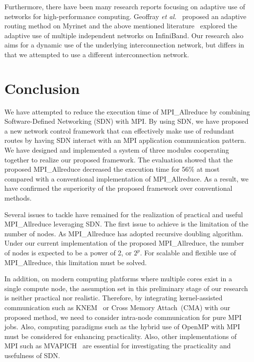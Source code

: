 Furthermore, there have been many research reports focusing on adaptive
use of networks for high-performance computing. Geoffray \emph{et
al.}~\autocite{Geoffray2008} proposed an adaptive routing method on Myrinet
and the above mentioned literature~\autocite{Jiuxing2004} explored the
adaptive use of multiple independent networks on InfiniBand. Our research also
aims for a dynamic use of the underlying interconnection network, but differs
in that we attempted to use a different interconnection network.

\section{Conclusion}\label{sec:iii-conclusion}

We have attempted to reduce the execution time of
MPI\_Allreduce by combining Software-Defined Networking (SDN)
with MPI\@. By using SDN, we have proposed a new network control framework
that can effectively make use of redundant routes by having SDN interact
with an MPI application communication pattern. We have designed and
implemented a system of three modules cooperating together to realize
our proposed framework. The evaluation showed that the proposed
MPI\_Allreduce decreased the execution time for 56\% at most
compared with a conventional implementation of MPI\_Allreduce.
As a result, we have confirmed the superiority of the proposed framework
over conventional methods.

Several issues to tackle have remained for the realization of practical
and useful MPI\_Allreduce leveraging SDN\@. The first issue to
achieve is the limitation of the number of nodes. As
MPI\_Allreduce has adopted recursive doubling algorithm. Under
our current implementation of the proposed MPI\_Allreduce, the
number of nodes is expected to be a power of 2, or \(2^p\). For scalable
and flexible use of MPI\_Allreduce, this limitation must be
solved.

In addition, on modern computing platforms where multiple cores exist in
a single compute node, the assumption set in this preliminary stage of
our research is neither practical nor realistic. Therefore, by
integrating kernel-assisted communication such as KNEM~\autocite{Goglin2013}
or Cross Memory Attach~(CMA) with our proposed method, we need to consider
intra-node communication for pure MPI jobs. Also, computing paradigms
such as the hybrid use of OpenMP with MPI must be considered for
enhancing practicality. Also, other implementations of MPI such as
MVAPICH~\autocite{mvapich} are essential for investigating the practicality
and usefulness of SDN\@.

